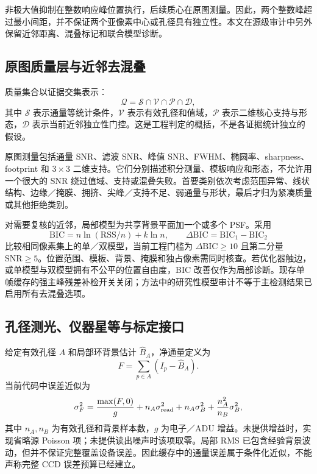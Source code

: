 \documentclass[UTF8,a4paper,11pt,fontset=windows]{ctexart}
\newcommand{\SNR}{\mathrm{SNR}}
\begin{document}
非极大值抑制在整数响应峰位置执行，后续质心在原图测量。因此，两个整数峰超过最小间距，并不保证两个亚像素中心或孔径具有独立性。本文在源级审计中另外保留近邻距离、混叠标记和联合模型诊断。

\subsection{原图质量层与近邻去混叠}
质量集合以证据交集表示：
\begin{equation}
 \mathcal Q=\mathcal S\cap\mathcal V\cap\mathcal P\cap\mathcal D,
 \label{eq:quality}
\end{equation}
其中 $\mathcal S$ 表示通量等统计条件，$\mathcal V$ 表示有效孔径和值域，$\mathcal P$ 表示二维核心支持与形态，$\mathcal D$ 表示当前近邻独立性门控。这是工程判定的概括，不是各证据统计独立的假设。

原图测量包括通量 SNR、滤波 SNR、峰值 SNR、FWHM、椭圆率、sharpness、footprint 和 $3\times3$ 二维支持。它们分别描述积分测量、模板响应和形态，不允许用一个很大的 SNR 绕过值域、支持或混叠失败。首要类别依次考虑范围异常、线状结构、边缘／掩膜、拥挤、尖峰／支持不足、弱通量与形状，最后才归为紧凑质量或其他拒绝类别。

对需要复核的近邻，局部模型为共享背景平面加一个或多个 PSF。采用
\begin{equation}
 \mathrm{BIC}=n\ln(\mathrm{RSS}/n)+k\ln n,\qquad
 \Delta\mathrm{BIC}=\mathrm{BIC}_{1}-\mathrm{BIC}_{2}
 \label{eq:bic}
\end{equation}
比较相同像素集上的单／双模型，当前工程门槛为 $\Delta\mathrm{BIC}\ge10$ 且第二分量 $\SNR\ge5$。位置范围、模板、背景、掩膜和独占像素需同时核查。若优化器触边，或单模型与双模型拥有不公平的位置自由度，BIC 改善仅作为局部诊断。现存单帧缓存的强主峰残差补检开关关闭；方法中的研究性模型审计不等于主检测结果已启用所有去混叠选项。

\subsection{孔径测光、仪器星等与标定接口}\label{sec:photometry}
给定有效孔径 $A$ 和局部环背景估计 $\widehat B_A$，净通量定义为
\begin{equation}
 F=\sum_{p\in A}(I_p-\widehat B_A).
 \label{eq:flux}
\end{equation}
当前代码中误差近似为
\begin{equation}
 \sigma_F^2=\frac{\max(F,0)}{g}
 +n_A\sigma_{\rm read}^2
 +n_A\sigma_B^2+\frac{n_A^2}{n_B}\sigma_B^2,
 \label{eq:fluxerr}
\end{equation}
其中 $n_A,n_B$ 为有效孔径和背景样本数，$g$ 为电子／ADU 增益。未提供增益时，实现省略源 Poisson 项；未提供读出噪声时该项取零。局部 RMS 已包含经验背景波动，但并不保证完整覆盖设备误差。因此缓存中的通量误差属于条件化近似，不能声称完整 CCD 误差预算已经建立。
\end{document}
